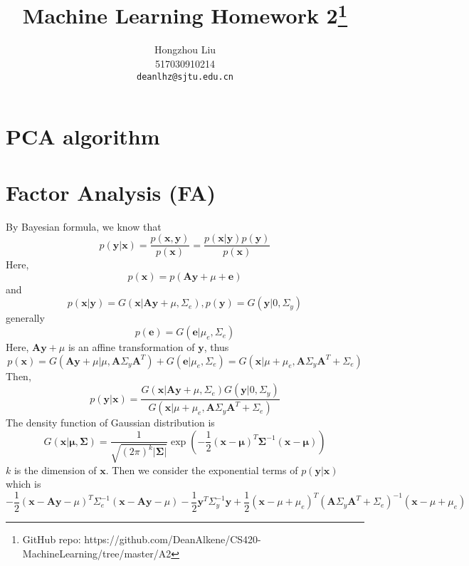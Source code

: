\documentclass{article}
\title{Machine Learning Homework 2\thanks{GitHub repo: https://github.com/DeanAlkene/CS420-MachineLearning/tree/master/A2}}
\author{
  Hongzhou Liu \\
  517030910214 \\
  \texttt{deanlhz@sjtu.edu.cn} \\
}
\begin{document}
\maketitle

\section{PCA algorithm}

\section{Factor Analysis (FA)}
By Bayesian formula, we know that
\begin{equation}
  p(\mathbf{y}|\mathbf{x})=\dfrac{p(\mathbf{x},\mathbf{y})}{p(\mathbf{x})}=\dfrac{p(\mathbf{x}|\mathbf{y})p(\mathbf{y})}{p(\mathbf{x})}
\end{equation}
Here, 
\begin{equation}
  p(\mathbf{x})=p(\mathbf{Ay}+\mu+\mathbf{e})
\end{equation}
and
\begin{equation}
  p(\mathbf{x}|\mathbf{y})=G(\mathbf{x}|\mathbf{Ay}+\mu,\Sigma_e),p(\mathbf{y})=G(\mathbf{y}|0,\Sigma_y)
\end{equation}
generally 
\begin{equation}
  p(\mathbf{e})=G(\mathbf{e}|\mu_e,\Sigma_e)  
\end{equation}
Here, $\mathbf{Ay}+\mu$ is an affine transformation of $\mathbf{y}$, thus 
\begin{equation}
  p(\mathbf{x})=G(\mathbf{Ay}+\mu|\mu, \mathbf{A}\Sigma_y\mathbf{A}^T)+G(\mathbf{e}|\mu_e,\Sigma_e)=G(\mathbf{x}|\mu+\mu_e, \mathbf{A}\Sigma_y\mathbf{A}^T+\Sigma_e)  
\end{equation}
Then, 
\begin{equation}
  p(\mathbf{y}|\mathbf{x})=\dfrac{G(\mathbf{x}|\mathbf{Ay}+\mu,\Sigma_e)G(\mathbf{y}|0,\Sigma_y)}{G(\mathbf{x}|\mu+\mu_e, \mathbf{A}\Sigma_y\mathbf{A}^T+\Sigma_e)}  
\end{equation}
The density function of Gaussian distribution is 
\begin{equation}
  G(\mathbf{x}|\mathbf{\mu},\mathbf{\Sigma})=\dfrac{1}{\sqrt{(2\pi)^k|\mathbf{\Sigma}|}}\exp(-\dfrac{1}{2}(\mathbf{x}-\mathbf{\mu})^T\mathbf{\Sigma}^{-1}(\mathbf{x}-\mathbf{\mu}))  
\end{equation}
$k$ is the dimension of $\mathbf{x}$.
Then we consider the exponential terms of $p(\mathbf{y}|\mathbf{x})$ which is
\begin{equation}
  -\dfrac{1}{2}(\mathbf{x}-\mathbf{Ay}-\mu)^T\Sigma_e^{-1}(\mathbf{x}-\mathbf{Ay}-\mu)-\dfrac{1}{2}\mathbf{y}^T\Sigma_y^{-1}\mathbf{y}+\dfrac{1}{2}(\mathbf{x}-\mu+\mu_e)^T(\mathbf{A}\Sigma_y\mathbf{A}^T+\Sigma_e)^{-1}(\mathbf{x}-\mu+\mu_e)  
\end{equation}
\end{document}
